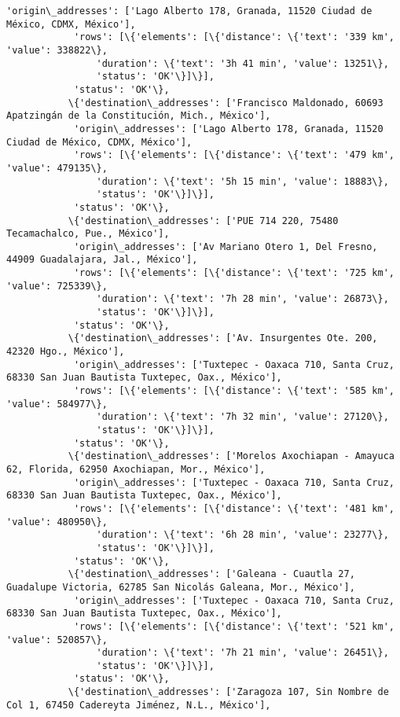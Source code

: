 \documentclass[11pt]{article}
\begin{document}
\begin{Verbatim}[commandchars=\\\{\}]
            'origin\_addresses': ['Lago Alberto 178, Granada, 11520 Ciudad de México, CDMX, México'],
            'rows': [\{'elements': [\{'distance': \{'text': '339 km', 'value': 338822\},
                'duration': \{'text': '3h 41 min', 'value': 13251\},
                'status': 'OK'\}]\}],
            'status': 'OK'\},
           \{'destination\_addresses': ['Francisco Maldonado, 60693 Apatzingán de la Constitución, Mich., México'],
            'origin\_addresses': ['Lago Alberto 178, Granada, 11520 Ciudad de México, CDMX, México'],
            'rows': [\{'elements': [\{'distance': \{'text': '479 km', 'value': 479135\},
                'duration': \{'text': '5h 15 min', 'value': 18883\},
                'status': 'OK'\}]\}],
            'status': 'OK'\},
           \{'destination\_addresses': ['PUE 714 220, 75480 Tecamachalco, Pue., México'],
            'origin\_addresses': ['Av Mariano Otero 1, Del Fresno, 44909 Guadalajara, Jal., México'],
            'rows': [\{'elements': [\{'distance': \{'text': '725 km', 'value': 725339\},
                'duration': \{'text': '7h 28 min', 'value': 26873\},
                'status': 'OK'\}]\}],
            'status': 'OK'\},
           \{'destination\_addresses': ['Av. Insurgentes Ote. 200, 42320 Hgo., México'],
            'origin\_addresses': ['Tuxtepec - Oaxaca 710, Santa Cruz, 68330 San Juan Bautista Tuxtepec, Oax., México'],
            'rows': [\{'elements': [\{'distance': \{'text': '585 km', 'value': 584977\},
                'duration': \{'text': '7h 32 min', 'value': 27120\},
                'status': 'OK'\}]\}],
            'status': 'OK'\},
           \{'destination\_addresses': ['Morelos Axochiapan - Amayuca 62, Florida, 62950 Axochiapan, Mor., México'],
            'origin\_addresses': ['Tuxtepec - Oaxaca 710, Santa Cruz, 68330 San Juan Bautista Tuxtepec, Oax., México'],
            'rows': [\{'elements': [\{'distance': \{'text': '481 km', 'value': 480950\},
                'duration': \{'text': '6h 28 min', 'value': 23277\},
                'status': 'OK'\}]\}],
            'status': 'OK'\},
           \{'destination\_addresses': ['Galeana - Cuautla 27, Guadalupe Victoria, 62785 San Nicolás Galeana, Mor., México'],
            'origin\_addresses': ['Tuxtepec - Oaxaca 710, Santa Cruz, 68330 San Juan Bautista Tuxtepec, Oax., México'],
            'rows': [\{'elements': [\{'distance': \{'text': '521 km', 'value': 520857\},
                'duration': \{'text': '7h 21 min', 'value': 26451\},
                'status': 'OK'\}]\}],
            'status': 'OK'\},
           \{'destination\_addresses': ['Zaragoza 107, Sin Nombre de Col 1, 67450 Cadereyta Jiménez, N.L., México'],

\end{Verbatim}
\end{document}
